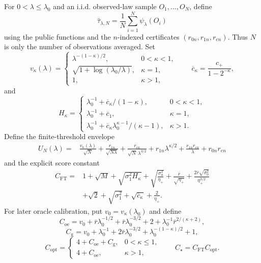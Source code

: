 For \(0<\lambda\leq\lambda_0\) and an i.i.d. observed-law sample
\(O_1,\ldots,O_N\), define
\[
\widehat\tau_{\lambda,N}=\frac1N\sum_{i=1}^N\psi_\lambda(O_i)
\]
using the public functions and the \(n\)-indexed certificates
\((r_{0n},r_{1n},r_{en})\).  Thus \(N\) is only the number of observations
averaged.  Set
\[
v_\kappa(\lambda)=
\begin{cases}
\lambda^{-(1-\kappa)/2},&0<\kappa<1,\\
\sqrt{1+\log(\lambda_0/\lambda)},&\kappa=1,\\
1,&\kappa>1,
\end{cases}
\qquad
\overline c_\kappa=\frac{c_+}{1-2^{-\kappa}},
\]
and
\[
H_\kappa=
\begin{cases}
\lambda_0^{-1}+\overline c_\kappa/(1-\kappa),&0<\kappa<1,\\
\lambda_0^{-1}+\overline c_1,&\kappa=1,\\
\lambda_0^{-1}+\overline c_\kappa\lambda_0^{\kappa-1}/(\kappa-1),&\kappa>1.
\end{cases}
\]
Define the finite-threshold envelope
\[
\begin{split}
U_N(\lambda)={}&
\frac{v_\kappa(\lambda)}{\sqrt N}
+\frac{r_{1n}}{\sqrt{N\lambda}}
+\frac{r_{en}}{\sqrt N\,\lambda^{3/2}}
+r_{1n}\lambda^{\kappa/2}
+\frac{r_{1n}r_{en}}{\lambda}
+r_{0n}r_{en}
\end{split}
\]
and the explicit score constant
\[
\begin{split}
C_{\mathrm{FT}}={}&1+\sqrt M+\sqrt{\sigma_1^2H_\kappa}
+\sqrt{\frac{\sigma_0^2}{\eta_+}}
+\frac{\bar r}{\sqrt{\eta_+}}
+\frac{2\bar r\sqrt{\sigma_0^2}}{\eta_+^{3/2}}\\
&+\sqrt2+\sqrt{\sigma_1^2}+\sqrt{\overline c_\kappa}
+\frac2{\eta_+}.
\end{split}
\]
For later oracle calibration, put \(v_0=v_\kappa(\lambda_0)\) and define
\[
C_{\mathrm{oe}}
=v_0+\bar r\lambda_0^{-1/2}+\bar r\lambda_0^{-3/2}
+2+\lambda_0^{-1}\bar r^{2/(\kappa+2)},
\]
\[
C_{\mathrm g}
=v_0+\lambda_0^{-1}+2\bar r\lambda_0^{-3/2}
+\lambda_0^{-(1-\kappa)/2}+1,
\]
\[
C_{\mathrm{opt}}=
\begin{cases}
4+C_{\mathrm{oe}}+C_{\mathrm g},&0<\kappa\leq1,\\
4+C_{\mathrm{oe}},&\kappa>1,
\end{cases}
\qquad
C_\star=C_{\mathrm{FT}}C_{\mathrm{opt}}.
\]

